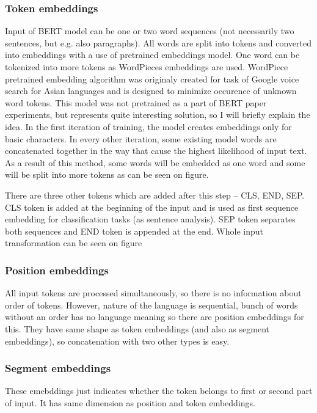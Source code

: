 \subsubsection*{Token embeddings}
Input of BERT model can be one or two word sequences (not necessarily two sentences, but e.g. also paragraphs). All words are split into tokens and converted into embeddings with a use of pretrained embeddings model. One word can be tokenized into more tokens as WordPieces %
embeddings are used. WordPiece pretrained embedding algorithm was originaly created for task of Google voice search for Asian languages and is designed to minimize occurence of unknown word tokens. This model was not pretrained as a part of BERT paper experiments, but represents quite interesting solution, so I will briefly explain the idea. In the first iteration of training, the model creates embeddings only for basic characters. In every other iteration, some existing model words are concatenated together in the way that cause the highest likelihood of input text. As a result of this method, some words will be embedded as one word and some will be split into more tokens as can be seen on figure. %
\par
There are three other tokens which are added after this step -- CLS, END, SEP. 
CLS token is added at the beginning of the input and is used as first sequence embedding for classification tasks (as sentence analysis). SEP token separates both sequences and END token is appended at the end. Whole input transformation can be seen on figure %

\subsubsection*{Position embeddings}
All input tokens are processed simultaneously, so there is no information about order of tokens. However, nature of the language is sequential, bunch of words without an order has no language meaning so there are position embeddings for this. They have same shape as token embeddings (and also as segment embeddings), so concatenation with two other types is easy.

\subsubsection*{Segment embeddings}
These emebddings just indicates whether the token belongs to first or second part of input. It has same dimension as position and token embeddings.

